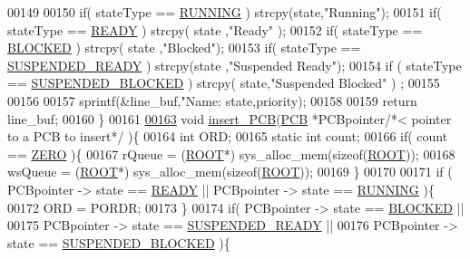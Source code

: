 \begin{DoxyCode}
00149         
00150         \textcolor{keywordflow}{if}( stateType == \hyperlink{mpx__r2_8h_a6fb7181d994ee98e735494be55809708}{RUNNING} ) strcpy(state,\textcolor{stringliteral}{"Running"});
00151         \textcolor{keywordflow}{if}( stateType == \hyperlink{mpx__r2_8h_ad1235d5ce36f7267285e82dccd428aa6}{READY} ) strcpy( state ,\textcolor{stringliteral}{"Ready"} );
00152         \textcolor{keywordflow}{if}( stateType == \hyperlink{mpx__r2_8h_a48f6457243719e7031768d4100741159}{BLOCKED} ) strcpy( state ,\textcolor{stringliteral}{"Blocked"});
00153         \textcolor{keywordflow}{if}( stateType == \hyperlink{mpx__r2_8h_a07b1141143e8825b04670da23fca8cc7}{SUSPENDED_READY} ) strcpy(state ,\textcolor{stringliteral}{"Suspended Ready"});
00154         \textcolor{keywordflow}{if} ( stateType == \hyperlink{mpx__r2_8h_a6e41bb5a80c5049e8d364bab8ee4d73a}{SUSPENDED_BLOCKED} ) strcpy( state,\textcolor{stringliteral}{"Suspended Blocked"} )
       ;
00155         
00156 
00157     sprintf(&line\_buf,\textcolor{stringliteral}{"Name: %
       state,priority); 
00158         
00159         \textcolor{keywordflow}{return} line\_buf; 
00160 \}
00161 
\hypertarget{mpx__r2_8c_source_l00163}{}\hyperlink{mpx__r2_8h_aa3b334e3a5afd6e590917667ad359a6f}{00163} \textcolor{keywordtype}{void} \hyperlink{mpx__r2_8c_aa3b334e3a5afd6e590917667ad359a6f}{insert_PCB}(\hyperlink{structprocess}{PCB} *PCBpointer\textcolor{comment}{/*< pointer to a PCB to insert*/} )\{ 
00164    \textcolor{keywordtype}{int} ORD; 
00165    \textcolor{keyword}{static} \textcolor{keywordtype}{int} count; 
00166         \textcolor{keywordflow}{if}( count == \hyperlink{mpx__r2_8h_ac328e551bde3d39b6d7b8cc9e048d941}{ZERO} )\{ 
00167                 rQueue = (\hyperlink{structroot}{ROOT}*) sys\_alloc\_mem(\textcolor{keyword}{sizeof}(\hyperlink{structroot}{ROOT}));
00168                 wsQueue = (\hyperlink{structroot}{ROOT}*) sys\_alloc\_mem(\textcolor{keyword}{sizeof}(\hyperlink{structroot}{ROOT}));
00169         \}
00170    
00171    \textcolor{keywordflow}{if} ( PCBpointer -> state == \hyperlink{mpx__r2_8h_ad1235d5ce36f7267285e82dccd428aa6}{READY} || PCBpointer -> state == \hyperlink{mpx__r2_8h_a6fb7181d994ee98e735494be55809708}{RUNNING} )\{
00172                 ORD  = PORDR; 
00173         \}
00174         \textcolor{keywordflow}{if}( PCBpointer -> state == \hyperlink{mpx__r2_8h_a48f6457243719e7031768d4100741159}{BLOCKED} ||
00175                 PCBpointer -> state == \hyperlink{mpx__r2_8h_a07b1141143e8825b04670da23fca8cc7}{SUSPENDED_READY} || 
00176                 PCBpointer -> state == \hyperlink{mpx__r2_8h_a6e41bb5a80c5049e8d364bab8ee4d73a}{SUSPENDED_BLOCKED} )\{
}
\end{DoxyCode}
